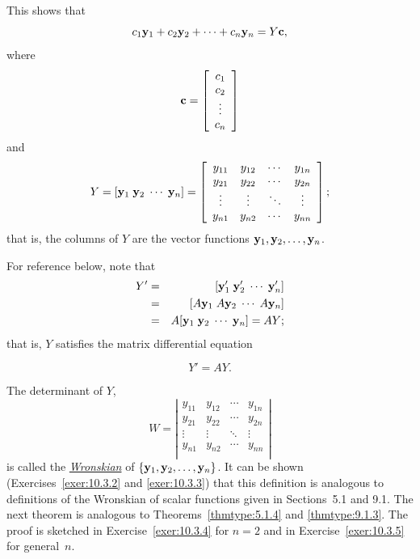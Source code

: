This shows that
\begin{equation}
  \label{eq:10.3.3}c_{1}{\bf y}_{1}+c_{2}{\bf y}_{2}+\cdots+c_{n}{\bf y}_{n}=Y{\bf c},
\end{equation}
where
\[
  {\bf c}=\left[\begin{array}{c}c_1\\c_2\\\vdots\\c_n\end{array}\right]
\]
and
\begin{equation}
  \label{eq:10.3.4}Y=[{\bf y}_{1}\;{\bf y}_{2}\;\cdots\;{\bf y}_{n}]= \left[
  \begin{array}{cccc}
    y_{11} & y_{12} & \cdots & y_{1n} \\
    y_{21} & y_{22} & \cdots & y_{2n} \\
    \vdots & \vdots & \ddots & \vdots \\
    y_{n1} & y_{n2} & \cdots & y_{nn} \\
  \end{array}\right];
\end{equation}
that is, the columns of $Y$ are the vector functions ${\bf y}_{1},{\bf y}_{2},\dots,{\bf y}_{n}$.

For reference below, note that
\begin{eqnarray*}
  Y' & = & [{\bf y}_{1}'\;{\bf y}_{2}'\;\cdots\;{\bf y}_{n}'] \\
     & = & [A{\bf y}_{1}\;A{\bf y}_{2}\;\cdots\;A{\bf y}_{n}] \\
     & = & A[{\bf y}_{1}\;{\bf y}_{2}\;\cdots\;{\bf y}_{n}]=AY;
\end{eqnarray*}
that is, $Y$ satisfies the matrix differential equation

\[
  Y'=AY.
\]

The determinant of $Y$,
\begin{equation}
  \label{eq:10.3.5}W=\left|
  \begin{array}{cccc}
    y_{11} & y_{12} & \cdots & y_{1n} \\
    y_{21} & y_{22} & \cdots & y_{2n} \\
    \vdots & \vdots & \ddots & \vdots \\
    y_{n1} & y_{n2} & \cdots & y_{nn} \\
  \end{array}\right|
\end{equation}
is called the
\href{https://mathshistory.st-andrews.ac.uk/Biographies/Wronski/}{\color{blue}
\it Wronskian\/}
of $\{{\bf y}_{1},{\bf y}_{2},\dots,{\bf y}_{n}\}$. It can be shown (Exercises~\ref{exer:10.3.2} and
\ref{exer:10.3.3}) that this definition is analogous to definitions of the Wronskian of scalar
functions given in Sections~5.1 and 9.1. The next theorem is analogous to
Theorems~\ref{thmtype:5.1.4} and \ref{thmtype:9.1.3}. The proof is sketched in
Exercise~\ref{exer:10.3.4} for $n=2$ and in Exercise~\ref{exer:10.3.5} for general~$n$.

